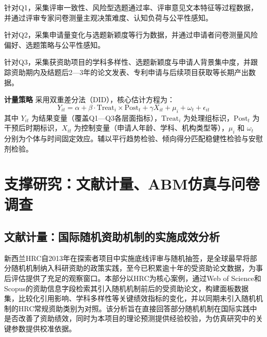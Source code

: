针对Q1，采集评审一致性、风险型选题通过率、评审意见文本特征等过程数据，并通过评审专家问卷测量主观决策难度、认知负荷与公平性感知。

针对Q2，采集申请量变化与选题新颖度等行为数据，并通过申请者问卷测量风险偏好、选题策略与公平性感知。

针对Q3，采集获资助项目的学科多样性、选题新颖度与申请人背景集中度，并跟踪资助期内及结题后2—3年的论文发表、专利申请与后续项目获取等长期产出数据。

\noindent\textbf{计量策略} \quad 采用双重差分法（DID），核心估计方程为：
\[
Y_{it} = \alpha + \beta \cdot \text{Treat}_i \times \text{Post}_t + \gamma X_{it} + \mu_i + \omega_t + \epsilon_{it}
\]
其中 $Y_{it}$ 为结果变量（覆盖Q1—Q3各层面指标），$\text{Treat}_i$ 为处理组标识，$\text{Post}_t$ 为干预后时期标识，$X_{it}$ 为控制变量（申请人年龄、学科、机构类型等），$\mu_i$ 和 $\omega_t$ 分别为个体与时间固定效应。辅以平行趋势检验、倾向得分匹配稳健性检验与安慰剂检验。

\section{\textbf{支撑研究：文献计量、ABM仿真与问卷调查}}

\subsection{\textbf{文献计量：国际随机资助机制的实施成效分析}}

新西兰HRC自2013年在探索者项目中实施底线评审与随机抽签，是全球最早将部分随机机制纳入科研资助的政策实践，至今已积累逾十年的受资助论文数据，为事后评估提供了充足的观察窗口。本部分以HRC为核心案例，通过Web of Science和Scopus的资助信息字段检索其引入随机机制前后的受资助论文，构建面板数据集，比较化引用影响、学科多样性等关键绩效指标的变化，并以同期未引入随机机制的HRC常规资助类别为对照。该分析旨在直接回答部分随机机制在国际实践中是否改善了资助绩效，同时为本项目的理论预测提供经验校验，为仿真研究中的关键参数提供校准依据。

